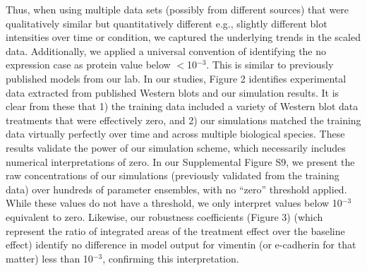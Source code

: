 Thus, when using multiple data sets (possibly from different sources) that were qualitatively similar but quantitatively different e.g., slightly different blot intensities over time or condition, we captured the underlying trends in the scaled data. Additionally, we applied a universal convention of identifying the no expression case as protein value below $<$10$^{-3}$. This is similar to previously published models from our lab. In our studies, Figure 2 identifies experimental data extracted from published Western blots and our simulation results. It is clear from these that 1) the training data included a variety of Western blot data treatments that were effectively zero, and 2) our simulations matched the training data virtually perfectly over time and across multiple biological species. These results validate the power of our simulation scheme, which necessarily includes numerical interpretations of zero. In our Supplemental Figure S9, we present the raw concentrations of our simulations (previously validated from the training data) over hundreds of parameter ensembles, with no “zero” threshold applied.  While these values do not have a threshold, we only interpret values below 10$^{-3}$ equivalent to zero. Likewise, our robustness coefficients (Figure 3) (which represent the ratio of integrated areas of the treatment effect over the baseline effect) identify no difference in model output for vimentin (or e-cadherin for that matter) less than 10$^{-3}$, confirming this interpretation.

